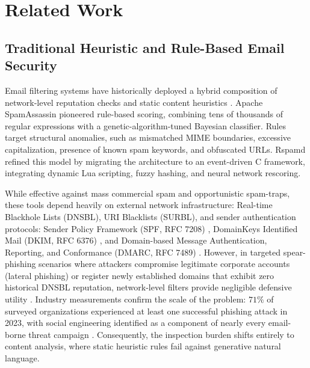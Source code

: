 \documentclass[journal]{IEEEtran}
\begin{document}
\section{Related Work}
\label{sec:related_work}

\subsection{Traditional Heuristic and Rule-Based Email Security}
Email filtering systems have historically deployed a hybrid composition of network-level reputation checks and static content heuristics \cite{salloum2021}. Apache SpamAssassin \cite{spamassassin2004} pioneered rule-based scoring, combining tens of thousands of regular expressions with a genetic-algorithm-tuned Bayesian classifier. Rules target structural anomalies, such as mismatched MIME boundaries, excessive capitalization, presence of known spam keywords, and obfuscated URLs. Rspamd \cite{stakhov2020rspamd} refined this model by migrating the architecture to an event-driven C framework, integrating dynamic Lua scripting, fuzzy hashing, and neural network rescoring.

While effective against mass commercial spam and opportunistic spam-traps, these tools depend heavily on external network infrastructure: Real-time Blackhole Lists (DNSBL), URI Blacklists (SURBL), and sender authentication protocols: Sender Policy Framework (SPF, RFC 7208) \cite{kitterman2014spf}, DomainKeys Identified Mail (DKIM, RFC 6376) \cite{crocker2011dkim}, and Domain-based Message Authentication, Reporting, and Conformance (DMARC, RFC 7489) \cite{kucherawy2015dmarc}. However, in targeted spear-phishing scenarios where attackers compromise legitimate corporate accounts (lateral phishing) or register newly established domains that exhibit zero historical DNSBL reputation, network-level filters provide negligible defensive utility \cite{bethany2025}. Industry measurements confirm the scale of the problem: $71\%$ of surveyed organizations experienced at least one successful phishing attack in 2023, with social engineering identified as a component of nearly every email-borne threat campaign \cite{proofpoint2024har}. Consequently, the inspection burden shifts entirely to content analysis, where static heuristic rules fail against generative natural language.
\end{document}
